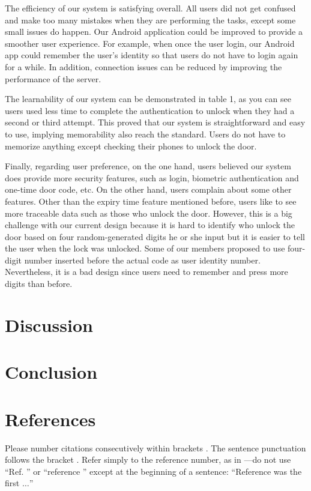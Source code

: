 \documentclass[conference]{IEEEtran}
\begin{document}
The efficiency of our system is satisfying overall. All users did not get confused and make too many mistakes when they are performing the tasks, except some small issues do happen. Our Android application could be improved to provide a smoother user experience. For example, when once the user login, our Android app could remember the user’s identity so that users do not have to login again for a while. In addition, connection issues can be reduced by improving the performance of the server.

The learnability of our system can be demonstrated in table 1, as you can see users used less time to complete the authentication to unlock when they had a second or third attempt. This proved that our system is straightforward and easy to use, implying memorability also reach the standard. Users do not have to memorize anything except checking their phones to unlock the door.

Finally, regarding user preference, on the one hand, users believed our system does provide more security features, such as login, biometric authentication and one-time door code, etc. On the other hand, users complain about some other features. Other than the expiry time feature mentioned before, users like to see more traceable data such as those who unlock the door. However, this is a big challenge with our current design because it is hard to identify who unlock the door based on four random-generated digits he or she input but it is easier to tell the user when the lock was unlocked. Some of our members proposed to use four-digit number inserted before the actual code as user identity number. Nevertheless, it is a bad design since users need to remember and press more digits than before.


\section{Discussion}

\section{Conclusion}


\section*{References}

Please number citations consecutively within brackets \cite{b1}. The 
sentence punctuation follows the bracket \cite{b2}. Refer simply to the reference 
number, as in \cite{b3}---do not use ``Ref. \cite{b3}'' or ``reference \cite{b3}'' except at 
the beginning of a sentence: ``Reference \cite{b3} was the first $\ldots$''
\end{document}
